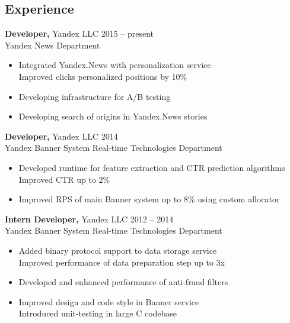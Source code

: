 \documentclass[margin]{res}
\begin{document}

\address{{\bf Contact info} \\ 1 Ambulatornyy pr-d, 5-2-40, Moscow, 125315  \\
+7 (915) 264-55-06 \\ tanyatik@yandex.ru, tanyatik1@gmail.com}


\begin{resume}



\section{Experience}
{\bf Developer,} Yandex LLC \hfill 2015 -- present \\
Yandex News Department
\begin{itemize} \itemsep -2pt \topsep 0ex
\item Integrated Yandex.News with personalization service \\
Improved clicks personalized positions by 10\%
\item Developing infrastructure for A/B testing
\item Developing search of origins in Yandex.News stories
\end{itemize}

 {\bf Developer,} Yandex LLC \hfill 2014 \\
Yandex Banner System Real-time Technologies Department
\begin{itemize} \itemsep -2pt \topsep 0ex
\item Developed runtime for feature extraction and CTR prediction algorithms \\
Improved CTR up to 2\%
\item Improved RPS of main Banner system up to 8\% using custom allocator
 \end{itemize}

 {\bf Intern Developer,} Yandex LLC \hfill 2012 -- 2014 \\
Yandex Banner System Real-time Technologies Department
\begin{itemize} \itemsep -2pt \topsep 0ex
\item Added binary protocol support to data storage service \\
Improved performance of data preparation step up to 3x
\item Developed and enhanced performance of anti-fraud filters
\item Improved design and code style in Banner service \\
Introduced unit-testing in large C codebase
\end{itemize}


\end{resume}
\end{document}
